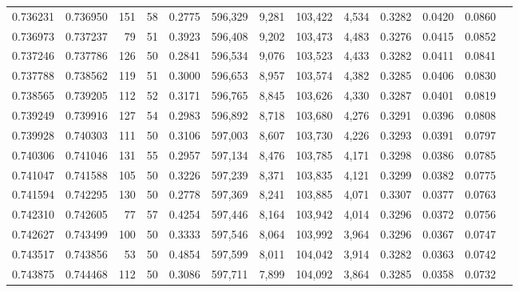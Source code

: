 \begin{tabular}{rrrrrrrrrrrrr}
0.736231 & 0.736950 &   151 &  58 &                                     0.2775 & 596,329 &   9,281 & 103,422 &   4,534 & 0.3282 & 0.0420 & 0.0860 \\
0.736973 & 0.737237 &    79 &  51 &                                     0.3923 & 596,408 &   9,202 & 103,473 &   4,483 & 0.3276 & 0.0415 & 0.0852 \\
0.737246 & 0.737786 &   126 &  50 &                                     0.2841 & 596,534 &   9,076 & 103,523 &   4,433 & 0.3282 & 0.0411 & 0.0841 \\
0.737788 & 0.738562 &   119 &  51 &                                     0.3000 & 596,653 &   8,957 & 103,574 &   4,382 & 0.3285 & 0.0406 & 0.0830 \\
0.738565 & 0.739205 &   112 &  52 &                                     0.3171 & 596,765 &   8,845 & 103,626 &   4,330 & 0.3287 & 0.0401 & 0.0819 \\
0.739249 & 0.739916 &   127 &  54 &                                     0.2983 & 596,892 &   8,718 & 103,680 &   4,276 & 0.3291 & 0.0396 & 0.0808 \\
0.739928 & 0.740303 &   111 &  50 &                                     0.3106 & 597,003 &   8,607 & 103,730 &   4,226 & 0.3293 & 0.0391 & 0.0797 \\
0.740306 & 0.741046 &   131 &  55 &                                     0.2957 & 597,134 &   8,476 & 103,785 &   4,171 & 0.3298 & 0.0386 & 0.0785 \\
0.741047 & 0.741588 &   105 &  50 &                                     0.3226 & 597,239 &   8,371 & 103,835 &   4,121 & 0.3299 & 0.0382 & 0.0775 \\
0.741594 & 0.742295 &   130 &  50 &                                     0.2778 & 597,369 &   8,241 & 103,885 &   4,071 & 0.3307 & 0.0377 & 0.0763 \\
0.742310 & 0.742605 &    77 &  57 &                                     0.4254 & 597,446 &   8,164 & 103,942 &   4,014 & 0.3296 & 0.0372 & 0.0756 \\
0.742627 & 0.743499 &   100 &  50 &                                     0.3333 & 597,546 &   8,064 & 103,992 &   3,964 & 0.3296 & 0.0367 & 0.0747 \\
0.743517 & 0.743856 &    53 &  50 &                                     0.4854 & 597,599 &   8,011 & 104,042 &   3,914 & 0.3282 & 0.0363 & 0.0742 \\
0.743875 & 0.744468 &   112 &  50 &                                     0.3086 & 597,711 &   7,899 & 104,092 &   3,864 & 0.3285 & 0.0358 & 0.0732 \\

\end{tabular}
